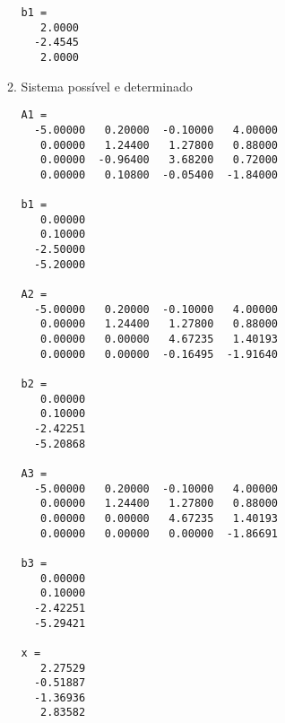 \documentclass[a4paper]{article}
\begin{document}
\begin{enumerate}
\begin{enumerate}
\begin{verbatim}
b1 =
   2.0000
  -2.4545
   2.0000
\end{verbatim}

  \item Sistema possível e determinado
\begin{verbatim}
A1 =
  -5.00000   0.20000  -0.10000   4.00000
   0.00000   1.24400   1.27800   0.88000
   0.00000  -0.96400   3.68200   0.72000
   0.00000   0.10800  -0.05400  -1.84000

b1 =
   0.00000
   0.10000
  -2.50000
  -5.20000

A2 =
  -5.00000   0.20000  -0.10000   4.00000
   0.00000   1.24400   1.27800   0.88000
   0.00000   0.00000   4.67235   1.40193
   0.00000   0.00000  -0.16495  -1.91640

b2 =
   0.00000
   0.10000
  -2.42251
  -5.20868

A3 =
  -5.00000   0.20000  -0.10000   4.00000
   0.00000   1.24400   1.27800   0.88000
   0.00000   0.00000   4.67235   1.40193
   0.00000   0.00000   0.00000  -1.86691

b3 =
   0.00000
   0.10000
  -2.42251
  -5.29421

x =
   2.27529
  -0.51887
  -1.36936
   2.83582
\end{verbatim}


\end{enumerate}
\end{enumerate}
\end{document}

